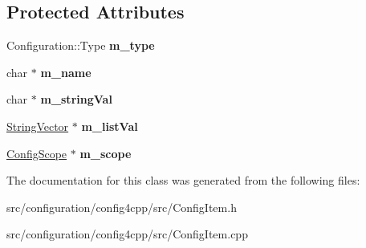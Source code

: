 \subsection*{Protected Attributes}
\begin{DoxyCompactItemize}
\item 
\hypertarget{classCONFIG4CPP__NAMESPACE_1_1ConfigItem_a97732e21abaa53cc86c055adcb9c7bc2}{Configuration\-::\-Type {\bfseries m\-\_\-type}}\label{classCONFIG4CPP__NAMESPACE_1_1ConfigItem_a97732e21abaa53cc86c055adcb9c7bc2}

\item 
\hypertarget{classCONFIG4CPP__NAMESPACE_1_1ConfigItem_a6cad122109711410fc6e1c4146dd1ec2}{char $\ast$ {\bfseries m\-\_\-name}}\label{classCONFIG4CPP__NAMESPACE_1_1ConfigItem_a6cad122109711410fc6e1c4146dd1ec2}

\item 
\hypertarget{classCONFIG4CPP__NAMESPACE_1_1ConfigItem_a6b54a9239321798beff068d52be82894}{char $\ast$ {\bfseries m\-\_\-string\-Val}}\label{classCONFIG4CPP__NAMESPACE_1_1ConfigItem_a6b54a9239321798beff068d52be82894}

\item 
\hypertarget{classCONFIG4CPP__NAMESPACE_1_1ConfigItem_a2f7d188fc4d49331eae74681a2b85732}{\hyperlink{classCONFIG4CPP__NAMESPACE_1_1StringVector}{String\-Vector} $\ast$ {\bfseries m\-\_\-list\-Val}}\label{classCONFIG4CPP__NAMESPACE_1_1ConfigItem_a2f7d188fc4d49331eae74681a2b85732}

\item 
\hypertarget{classCONFIG4CPP__NAMESPACE_1_1ConfigItem_afc25eec1fdb47acc47aaefcd69b0ebf6}{\hyperlink{classCONFIG4CPP__NAMESPACE_1_1ConfigScope}{Config\-Scope} $\ast$ {\bfseries m\-\_\-scope}}\label{classCONFIG4CPP__NAMESPACE_1_1ConfigItem_afc25eec1fdb47acc47aaefcd69b0ebf6}

\end{DoxyCompactItemize}


The documentation for this class was generated from the following files\-:\begin{DoxyCompactItemize}
\item 
src/configuration/config4cpp/src/Config\-Item.\-h\item 
src/configuration/config4cpp/src/Config\-Item.\-cpp\end{DoxyCompactItemize}
